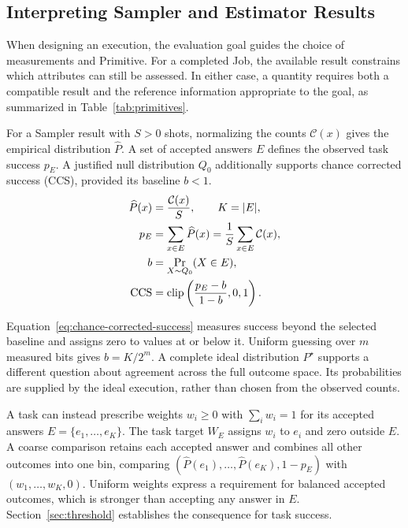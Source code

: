 \documentclass[10pt,conference]{IEEEtran}
\newcommand{\CCS}{\mathrm{CCS}}
\begin{document}
\subsection{Interpreting Sampler and Estimator Results}
\label{sec:primitives}

When designing an execution, the evaluation goal guides the choice of measurements and Primitive. For a completed Job, the available result constrains which attributes can still be assessed. In either case, a quantity requires both a compatible result and the reference information appropriate to the goal, as summarized in Table~\ref{tab:primitives}.

For a Sampler result with $S>0$ shots, normalizing the counts $\mathcal C(x)$ gives the empirical distribution $\widehat P$. A set of accepted answers $E$ defines the observed task success $p_E$. A justified null distribution $Q_0$ additionally supports chance corrected success (CCS), provided its baseline $b<1$.
\begin{align}
\widehat P(x)&=\frac{\mathcal C(x)}{S},\qquad K=|E|, \notag\\
p_E&=\sum_{x\in E}\widehat P(x)
=\frac{1}{S}\sum_{x\in E}\mathcal C(x),
\label{eq:success-mass}\\
b&=\Pr_{X\sim Q_0}(X\in E),
\label{eq:chance-baseline}\\
\CCS&=\mathrm{clip}\left(\frac{p_E-b}{1-b},0,1\right).
\label{eq:chance-corrected-success}
\end{align}

Equation~\ref{eq:chance-corrected-success} measures success beyond the selected baseline and assigns zero to values at or below it. Uniform guessing over $m$ measured bits gives $b=K/2^m$. A complete ideal distribution $P^{\star}$ supports a different question about agreement across the full outcome space. Its probabilities are supplied by the ideal execution, rather than chosen from the observed counts.

A task can instead prescribe weights $w_i\geq0$ with $\sum_iw_i=1$ for its accepted answers $E=\{e_1,\ldots,e_K\}$. The task target $W_E$ assigns $w_i$ to $e_i$ and zero outside $E$. A coarse comparison retains each accepted answer and combines all other outcomes into one bin, comparing $(\widehat P(e_1),\ldots,\widehat P(e_K),1-p_E)$ with $(w_1,\ldots,w_K,0)$. Uniform weights express a requirement for balanced accepted outcomes, which is stronger than accepting any answer in $E$. Section~\ref{sec:threshold} establishes the consequence for task success.
\end{document}
